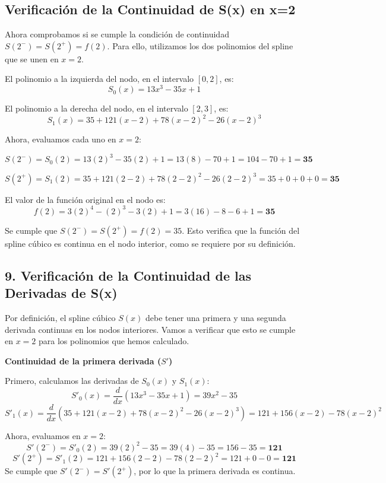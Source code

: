 \documentclass{article}
\begin{document}
\subsection*{Verificación de la Continuidad de S(x) en x=2}

Ahora comprobamos si se cumple la condición de continuidad $S(2^-) = S(2^+) = f(2)$. Para ello, utilizamos los dos polinomios del spline que se unen en $x=2$.

El polinomio a la izquierda del nodo, en el intervalo $[0,2]$, es:
$$ S_0(x) = 13x^3 - 35x + 1 $$

El polinomio a la derecha del nodo, en el intervalo $[2,3]$, es:
$$ S_1(x) = 35 + 121(x-2) + 78(x-2)^2 - 26(x-2)^3 $$

Ahora, evaluamos cada uno en $x=2$:

$$ S(2^-) = S_0(2) = 13(2)^3 - 35(2) + 1 = 13(8) - 70 + 1 = 104 - 70 + 1 = \mathbf{35} $$

$$ S(2^+) = S_1(2) = 35 + 121(2-2) + 78(2-2)^2 - 26(2-2)^3 = 35 + 0 + 0 + 0 = \mathbf{35} $$

El valor de la función original en el nodo es:
$$ f(2) = 3(2)^4 - (2)^3 - 3(2) + 1 = 3(16) - 8 - 6 + 1 = \mathbf{35} $$

Se cumple que $S(2^-) = S(2^+) = f(2) = 35$. Esto verifica que la función del spline cúbico es continua en el nodo interior, como se requiere por su definición.

\subsection*{9. Verificación de la Continuidad de las Derivadas de S(x)}

Por definición, el spline cúbico $S(x)$ debe tener una primera y una segunda derivada continuas en los nodos interiores. Vamos a verificar que esto se cumple en $x=2$ para los polinomios que hemos calculado.

\textbf{Continuidad de la primera derivada ($S'$) }

Primero, calculamos las derivadas de $S_0(x)$ y $S_1(x)$:
$$ S'_0(x) = \frac{d}{dx}(13x^3 - 35x + 1) = 39x^2 - 35 $$
$$ S'_1(x) = \frac{d}{dx}\left(35 + 121(x-2) + 78(x-2)^2 - 26(x-2)^3\right) = 121 + 156(x-2) - 78(x-2)^2 $$

Ahora, evaluamos en $x=2$:
$$ S'(2^-) = S'_0(2) = 39(2)^2 - 35 = 39(4) - 35 = 156 - 35 = \mathbf{121} $$
$$ S'(2^+) = S'_1(2) = 121 + 156(2-2) - 78(2-2)^2 = 121 + 0 - 0 = \mathbf{121} $$
Se cumple que $S'(2^-) = S'(2^+)$, por lo que la primera derivada es continua.
\end{document}
